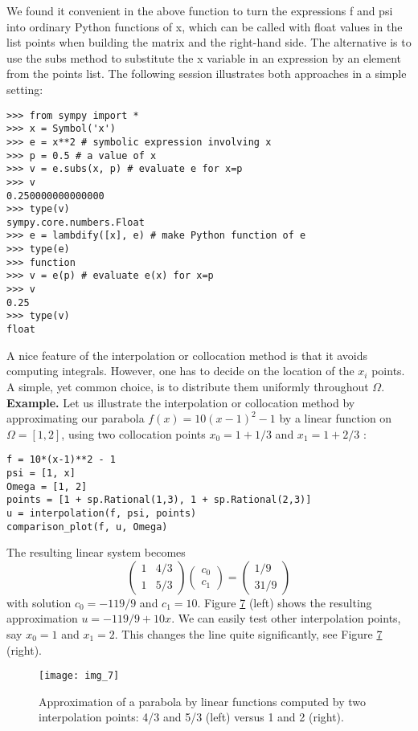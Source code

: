 \documentclass[../main.tex]{subfiles}
\begin{document}
We found it convenient in the above function to turn the expressions f
and psi into ordinary Python functions of x, which can be called with float
values in the list points when building the matrix and the right-hand side.
The alternative is to use the subs method to substitute the x variable in an
expression by an element from the points list. The following session illustrates
both approaches in a simple setting:\\
\begin{lstlisting}[numbers=none]
>>> from sympy import *
>>> x = Symbol('x')
>>> e = x**2 # symbolic expression involving x
>>> p = 0.5 # a value of x
>>> v = e.subs(x, p) # evaluate e for x=p
>>> v
0.250000000000000
>>> type(v)
sympy.core.numbers.Float
>>> e = lambdify([x], e) # make Python function of e
>>> type(e)
>>> function
>>> v = e(p) # evaluate e(x) for x=p
>>> v
0.25
>>> type(v)
float	
\end{lstlisting}
A nice feature of the interpolation or collocation method is that it avoids computing integrals. However, one has to decide on the location of the $x_{i}$ points. A simple, yet common choice, is to distribute them uniformly throughout $\Omega$.
\bigbreak
\noindent \textbf{Example.} Let us illustrate the interpolation or collocation method by approximating our parabola $f(x)=10(x-1)^{2}-1$ by a linear function on $\Omega=[1,2]$, using two collocation points $x_{0}=1+1 / 3$ and $x_{1}=1+2 / 3$ :
\begin{lstlisting}[numbers=none]
f = 10*(x-1)**2 - 1
psi = [1, x]
Omega = [1, 2]
points = [1 + sp.Rational(1,3), 1 + sp.Rational(2,3)]
u = interpolation(f, psi, points)
comparison_plot(f, u, Omega)		
\end{lstlisting}
The resulting linear system becomes
$$
\left(\begin{array}{ll}
	1 & 4 / 3 \\
	1 & 5 / 3
\end{array}\right)\left(\begin{array}{l}
	c_{0} \\
	c_{1}
\end{array}\right)=\left(\begin{array}{l}
	1 / 9 \\
	31 / 9
\end{array}\right)
$$
with solution $c_{0}=-119 / 9$ and $c_{1}=10$. Figure \hyperref[fig:img_7]{7} (left) shows the resulting approximation $u=-119 / 9+10 x$. We can easily test other interpolation points, say $x_{0}=1$ and $x_{1}=2$. This changes the line quite significantly, see Figure \hyperref[fig:img_7]{7} (right).
\begin{figure}[H]
	\centering
	\texttt{[image: img\_7]}
	\caption{Approximation of a parabola by linear functions computed by two
		interpolation points: 4/3 and 5/3 (left) versus 1 and 2 (right).}
	\label{fig:img_7}
\end{figure}
\end{document}
